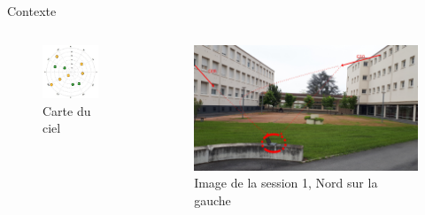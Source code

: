 \documentclass[xcolor=dvipsnames,envcountsect]{beamer}
\begin{document}
\begin{frame}{Contexte}
	\begin{columns}
		\begin{column}{0.5\textwidth}
			\begin{figure}
				\centering
				\includegraphics[width=0.9\textwidth]{./Figures/skyplot.jpg}
				\caption {Carte du ciel}
			\end{figure}
		\end{column}
		\begin{column}{0.5\textwidth}
			\begin{figure}
				\centering
				\includegraphics[width=1\textwidth]{./Figures/spot1.jpg}
				\caption {Image de la session 1, Nord sur la gauche}
			\end{figure}
		\end{column}

	\end{columns}
\end{frame}
\end{document}
